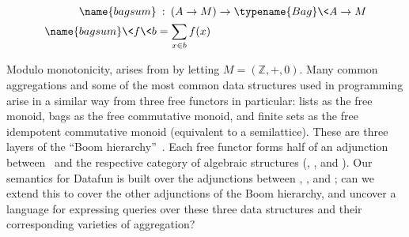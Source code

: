 \begin{align*}
  \name{bagsum} &\isa (A \to M) \to \typename{Bag}\<A \to M\\
  \name{bagsum} \<f \<b &= \sum_{x \in b} f(x)
\end{align*}

\noindent
Modulo monotonicity,  arises from  by letting $M =
(\mathbb{Z}, +, 0)$.
%
Many common aggregations and some of the most common data structures used in
programming arise in a similar way from three free functors in particular: lists
as the free monoid, bags as the free commutative monoid, and finite sets as the
free idempotent commutative monoid (equivalent to a semilattice). These are
three layers of the ``Boom
hierarchy''~\citep{DBLP:conf/ifip2-1/BackhouseH93}.\footnotemark{} Each free
functor forms half of an adjunction between \Set\ and the respective category of
algebraic structures (, , and ).
%
Our semantics for Datafun is built over the adjunctions between ,
, and ; can we extend this to cover the other
adjunctions of the Boom hierarchy, and uncover a language for expressing queries
over these three data structures and their corresponding varieties of
aggregation?






